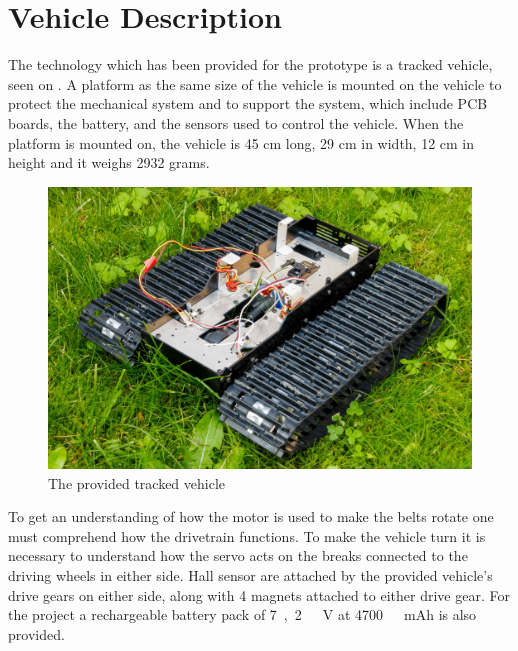 \section{Vehicle Description}
\label{sec:Vehicledescription}
The technology which has been provided for the prototype is a tracked vehicle, seen on . A platform as the same size of the vehicle is mounted on the vehicle to protect the mechanical system and to support the system, which include PCB boards, the battery, and the sensors used to control the vehicle. When the platform is mounted on, the vehicle is 45 cm long, 29 cm in width, 12 cm in height and it weighs 2932 grams.\\
%
\begin{figure}[H]
	\centering
	\includegraphics[scale=0.6]{figures/BeltVehicle.jpg}
	\caption{The provided tracked vehicle}
	\label{TrackedVehicle}
\end{figure}
%
To get an understanding of how the motor is used to make the belts rotate one must comprehend how the drivetrain functions. To make the vehicle turn it is necessary to understand how the servo acts on the breaks connected to the driving wheels in either side. Hall sensor are attached by the provided vehicle's drive gears on either side, along with 4 magnets attached to either drive gear. For the project a rechargeable battery pack of \si{7,2\ V} at \si{4700\ mAh} is also provided.